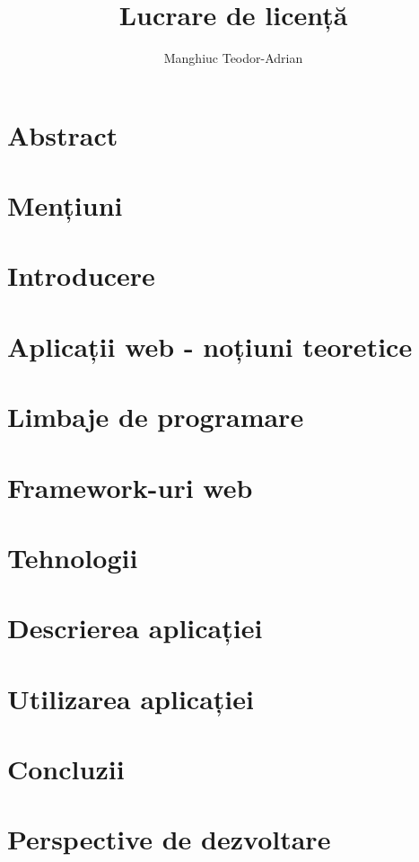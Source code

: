 \documentclass[12pt, twoside]{report}
\title{Lucrare de licență}
\author{Manghiuc Teodor-Adrian}
\date{}
\begin{document}
	
	
	\chapter*{Abstract}
	
	\chapter*{Mențiuni}
	
	\tableofcontents
	
	\chapter{Introducere}
	
	\chapter{Aplicații web - noțiuni teoretice}
	
	\chapter{Limbaje de programare}
	
	
	\chapter{Framework-uri web}
	
	
	\chapter{Tehnologii}
	
	
	\chapter{Descrierea aplicației}
	
	
	\chapter{Utilizarea aplicației}
	
	\chapter{Concluzii}
	
	\chapter{Perspective de dezvoltare}
	
	\printbibliography
	
\end{document}
